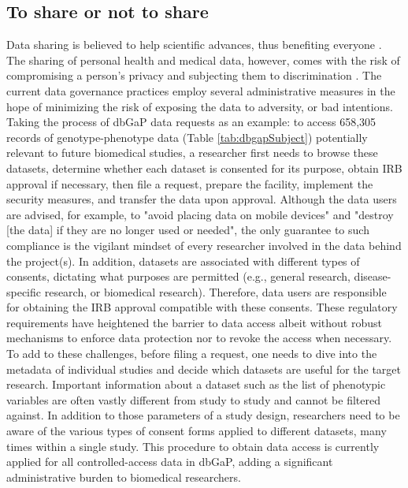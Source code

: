 \documentclass[letter]{bioinfo}
\begin{document}
	\subsection*{To share or not to share}
	Data sharing is believed to help scientific advances, thus benefiting everyone \citep{GA4GH:2014:Framework}. The sharing of personal health and medical data, however, comes with the risk of compromising a person's privacy and subjecting them to discrimination \citep{P3gConsortium:2009:Public,GA4GH:2014:Framework,Shringarpure:2015:Privacy}.  The current data governance practices employ several administrative measures in the hope of minimizing the risk of exposing the data to adversity, or bad intentions. Taking the process of dbGaP data requests as an example: to access 658,305 records of genotype-phenotype data (Table \ref{tab:dbgapSubject}) potentially relevant to future biomedical studies, a researcher first needs to browse these datasets, determine whether each dataset is consented for its purpose, obtain IRB approval if necessary, then file a request, prepare the facility, implement the security measures, and transfer the data upon approval. Although the data users are advised, for example, to "avoid placing data on mobile devices" and "destroy [the data] if they are no longer used or needed", the only guarantee to such compliance is the vigilant mindset of every researcher involved in the data behind the project(s).  In addition, datasets are associated with different types of consents, dictating what purposes are permitted (e.g., general research, disease-specific research, or biomedical research). Therefore, data users are responsible for obtaining the IRB approval compatible with these consents. These regulatory requirements have heightened the barrier to data access albeit without robust mechanisms to enforce data protection nor to revoke the access when necessary.  To add to these challenges, before filing a request, one needs to dive into the metadata of individual studies and decide which datasets are useful for the target research. Important information about a dataset such as the list of phenotypic variables are often vastly different from study to study and cannot be filtered against. In addition to those parameters of a study design, researchers need to be aware of the various types of consent forms applied to different datasets, many times within a single study. This procedure to obtain data access is currently applied for all controlled-access data in dbGaP, adding a significant administrative burden to biomedical researchers.
\end{document}
